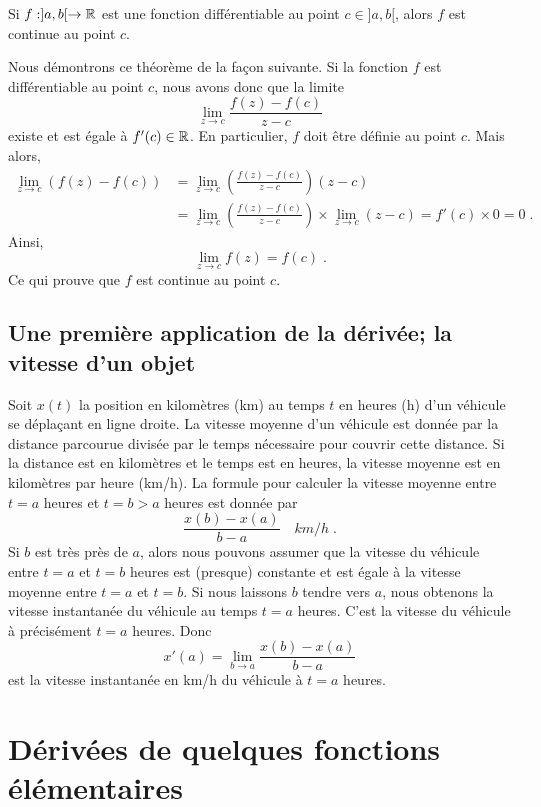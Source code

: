 {\begin{focus}{\thm}
Si $f:]a,b[\rightarrow \mathbb{R}$ est une fonction différentiable au point
$c\in ]a,b[$, alors $f$ est continue au point $c$.
\end{focus}

Nous démontrons ce théorème de la façon suivante.  Si la fonction
$f$ est différentiable au point $c$, nous avons donc que la limite
\[
\lim_{z \rightarrow c} \frac{f(z)-f(c)}{z-c}
\]
existe et est égale à $f'(c) \in \mathbb{R}$.  En particulier, $f$ doit être
définie au point $c$.  Mais alors,
\begin{align*}
\lim_{z \rightarrow c} \left( f(z) - f(c) \right)
&= \lim_{z\rightarrow c} \left(\frac{f(z)-f(c)}{z-c}\right) (z-c) \\
&= \lim_{z\rightarrow c} \left(\frac{f(z)-f(c)}{z-c}\right)
\times \lim_{z\rightarrow c} (z-c)
= f'(c) \times 0 = 0 \; .
\end{align*}
Ainsi,
\[
\lim_{z\rightarrow c} f(z) = f(c) \; .
\]
Ce qui prouve que $f$ est continue au point $c$.

\subsection{Une première application de la dérivée; la vitesse d'un
  objet}

Soit $x(t)$ la position en kilomètres (km) au temps $t$ en heures (h)
d'un véhicule se déplaçant en ligne droite.  La vitesse moyenne d'un
véhicule est donnée par la distance parcourue divisée par le temps
nécessaire pour couvrir cette distance.  Si la distance est en
kilomètres et le temps est en heures, la vitesse moyenne est en
kilomètres par heure (km/h).  La formule pour calculer la vitesse
moyenne entre $t=a$ heures et $t=b>a$ heures est donnée par
\[
\frac{x(b)-x(a)}{b-a} \quad km/h \; .
\]
Si $b$ est très près de $a$, alors nous pouvons assumer que la vitesse du
véhicule entre $t=a$ et $t=b$ heures est (presque) constante et est
égale à la vitesse moyenne entre $t=a$ et $t=b$.  Si nous laissons $b$
tendre vers $a$, nous obtenons la vitesse instantanée du véhicule au
temps $t=a$ heures.  C'est la vitesse du véhicule à précisément $t=a$
heures.  Donc
\[
x'(a) = \lim_{b\rightarrow a} \frac{x(b)-x(a)}{b-a}
\]
est la vitesse instantanée en km/h du véhicule à $t=a$ heures.  

\section{Dérivées de quelques fonctions élémentaires}
\label{basic_der}

}
